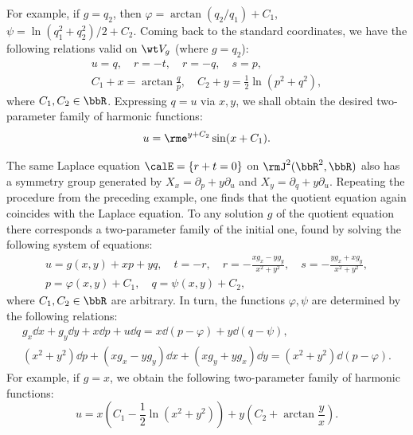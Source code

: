 \begin{example}
    For example, if $g=q_2$, then $\varphi=\arctan(q_2/q_1)+C_1$, $\psi=\ln(q_1^2+q_2^2)/2+C_2$. Coming back to the standard coordinates, we have the following relations valid on $\wt V_g$ (where $g=q_2$):
    \begin{gather}
        u=q,\quad r=-t,\quad r=-q,\quad s=p,\\
        C_1+x=\arctan\frac{q}{p},\quad C_2+y=\frac12\ln(p^2+q^2),
    \end{gather}
    where $C_1,C_2\in\bbR$. Expressing $q=u$ via $x,y$, we shall obtain the desired two-parameter family of harmonic functions:
    \[u=\rme^{y+C_2}\sin (x+C_1).\]
\end{example}


\begin{example}
    The same Laplace equation $\calE=\{r+t=0\}$ on $\rmJ^2(\bbR^2,\bbR)$ also has a symmetry group generated by $X_{x}=\partial_p+y\partial_u$ and $X_y=\partial_q+y\partial_u$. Repeating the procedure from the preceding example, one finds that the quotient equation again coincides with the Laplace equation. To any solution $g$ of the quotient equation there corresponds a two-parameter family of the initial one, found by solving the following system of equations:
    \begin{gather}
        u=g(x,y)+xp+yq,\quad t=-r,\quad r=-\frac{xg_x-yg_y}{x^2+y^2},\quad s=-\frac{yg_x+xg_y}{x^2+y^2},\\
        p=\varphi(x,y)+C_1,\quad q=\psi(x,y)+C_2,
    \end{gather}
    where $C_1,C_2\in\bbR$ are arbitrary. In turn, the functions $\varphi,\psi$ are determined by the following relations:
    \begin{gather}
        g_x \dd x+g_y\dd y+x\dd p+u\dd q=x\dd(p-\varphi)+y\dd(q-\psi),\\
        (x^2+y^2)\dd p+(xg_x-yg_y)\dd x+(xg_y+yg_x)\dd y=(x^2+y^2)\dd(p-\varphi).
    \end{gather}
    For example, if $g=x$, we obtain the following two-parameter family of harmonic functions:
    \[u=x\left(C_1-\frac12\ln(x^2+y^2)\right)+y\left(C_2+\arctan\frac{y}{x}\right).\]
\end{example}


